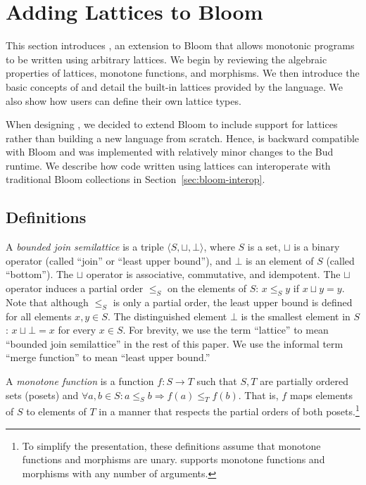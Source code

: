 \section{Adding Lattices to Bloom}
\label{sec:lang}

This section introduces \lang, an extension to Bloom that allows monotonic
programs to be written using arbitrary lattices. We begin by reviewing the
algebraic properties of lattices, monotone functions, and morphisms. We then
introduce the basic concepts of \lang and detail the built-in lattices provided
by the language. We also show how users can define their own lattice types.

When designing \lang, we decided to extend Bloom to include support for lattices
rather than building a new language from scratch. Hence, \lang is backward
compatible with Bloom and was implemented with relatively minor changes to the
Bud runtime. We describe how code written using lattices can interoperate with
traditional Bloom collections in Section~\ref{sec:bloom-interop}.

\subsection{Definitions}
\label{sec:lattice-defn}
A \emph{bounded join semilattice} is a triple $\langle S, \sqcup, \bot\rangle$,
where $S$ is a set, $\sqcup$ is a binary operator
(called ``join'' or ``least upper bound''), and $\bot$ is an element of $S$
(called ``bottom''). The $\sqcup$ operator
is associative, commutative, and idempotent. The $\sqcup$ operator induces a partial order $\leq_S$ on the elements of $S$: $x \leq_S y$ if $x \sqcup y = y$.
% 
Note
that although $\leq_S$ is only a partial order, the least upper bound is defined for
all elements $x,y \in S$. The distinguished element $\bot$ is the smallest
element in $S$:  $x \sqcup \bot = x$ for every $x \in S$. For brevity,
we use the term ``lattice'' to mean ``bounded join semilattice'' in the rest of
this paper. We use the informal term ``merge function'' to mean ``least upper
bound.''

A \emph{monotone function} is a function $f: S \to T$ such that $S,T$ are
partially ordered sets (posets) and $\forall a,b \in S: a \leq_S b \Rightarrow
f(a) \leq_T f(b)$. That is, $f$ maps elements of $S$ to elements of $T$ in a
manner that respects the partial orders of both posets.\footnote{To simplify the
  presentation, these definitions assume that monotone functions and morphisms
  are unary. \lang supports monotone functions and morphisms with any number of
  arguments.}

